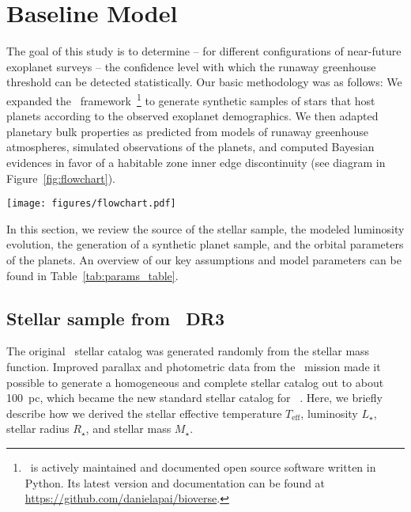 \documentclass[twocolumn,twocolappendix,linenumbers]{aastex631}
\begin{document}
\section{Baseline Model}\label{sec:met_baseline}
The goal of this study is to determine -- for different configurations of near-future exoplanet surveys -- the confidence level with which the runaway greenhouse threshold can be detected statistically. %
Our basic methodology was as follows:
We expanded the \bioverse\ framework~\citep{Bixel2020,Bixel2021}\footnote{\bioverse\ is actively maintained and documented open source software written in Python. Its latest version and documentation can be found at \url{https://github.com/danielapai/bioverse}.} to generate synthetic samples of stars that host planets according to the observed exoplanet demographics.
We then adapted planetary bulk properties as predicted from models of runaway greenhouse atmospheres, simulated observations of the planets, and computed Bayesian evidences in favor of a habitable zone inner edge discontinuity (see diagram in Figure~\ref{fig:flowchart}).
\begin{figure*}
    \begin{centering}
        \texttt{[image: figures/flowchart.pdf]}
        \caption{Workflow of our hypothesis testing with \bioverse. First, we generate a sample of stars and populate them with planets based on \kepler\ demographics.
            A fraction of them are then assigned a runaway greenhouse climate based on the model described in Sect.~\ref{sec:met_rghmodel}.
        We then simulate an exoplanet survey, whereby selection effects and detection biases are introduced. Finally, we test the runaway greenhouse hypothesis based on data from the survey simulation.
        By iterating through these steps, we compute the statistical power of testing the hypothesis for different survey designs.}
        \label{fig:flowchart}
    \end{centering}
\end{figure*}
In this section, we review the source of the stellar sample, the modeled luminosity evolution, the generation of a synthetic planet sample, and the orbital parameters of the planets.
An overview of our key assumptions and model parameters can be found in Table~\ref{tab:params_table}.



\subsection{Stellar sample from \gaia\ DR3}
The original \bioverse\ stellar catalog was generated randomly from the \citet{Chabrier2003} stellar mass function.
Improved parallax and photometric data from the \gaia\ mission made it possible to generate a homogeneous and complete stellar catalog out to about 100~pc, which became the new standard stellar catalog for \bioverse ~\citep{Hardegree-Ullman2023}.
Here, we briefly describe how we derived the stellar effective temperature $T_{\mathrm{eff}}$, luminosity $L_{\star}$, stellar radius $R_{\star}$, and stellar mass $M_{\star}$.
\end{document}
